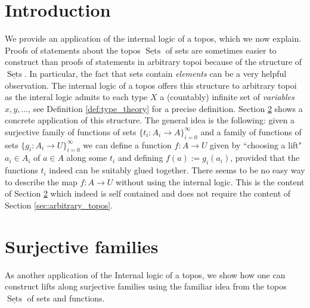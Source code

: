 \documentclass{birkjour}
\theoremstyle{plain}
\theoremstyle{definition}
\newcommand{\lto}{\longrightarrow}
\begin{document}
\section{Introduction}
We provide an application of the internal logic of a topos, which we now explain. Proofs of statements about the topos $\underline{\operatorname{Sets}}$ of sets are sometimes easier to construct than proofs of statements in arbitrary topoi because of the structure of $\underline{\operatorname{Sets}}$. In particular, the fact that sets contain \emph{elements} can be a very helpful observation. The internal logic of a topos offers this structure to arbitrary topoi as the interal logic admits to each type $X$ a (countably) infinite set of \emph{variables} $x,y,...$, see Definition \ref{def:type_theory} for a precise definition. Section \ref{sec:surjective_families} shows a concrete application of this structure. The general idea is the following: given a surjective family of functions of sets $\lbrace t_i: A_i \lto A\rbrace_{i = 0}^\infty$ and a family of functions of sets $\lbrace g_i: A_i \lto U\rbrace_{i = 0}^\infty$ we can define a function $f: A \lto U$ given by ``choosing a lift" $a_i \in A_i$ of $a \in A$ along some $t_i$ and defining $f(a) := g_i(a_i)$, provided that the functions $t_i$ indeed can be suitably glued together. There seems to be no easy way to describe the map $f:A \lto U$ without using the internal logic. This is the content of Section \ref{sec:surjective_families} which indeed is self contained and does not require the content of Section \ref{sec:arbitrary_topos}.

\section{Surjective families}\label{sec:surjective_families}\label{sec:surjective_family}
As another application of the Internal logic of a topos, we show how one can construct lifts along surjective families using the familiar idea from the topos $\underline{\operatorname{Sets}}$ of sets and functions.
\end{document}
